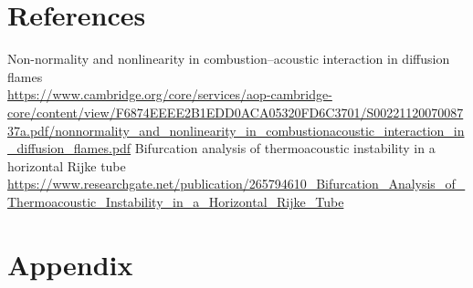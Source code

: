 \documentclass[8pt]{article} %
\begin{document}
\section{References}
\begin{thebibliography}{99}

Non-normality and nonlinearity in combustion–acoustic interaction in diffusion flames\\ \url{https://www.cambridge.org/core/services/aop-cambridge-core/content/view/F6874EEEE2B1EDD0ACA05320FD6C3701/S0022112007008737a.pdf/nonnormality_and_nonlinearity_in_combustionacoustic_interaction_in_diffusion_flames.pdf}
Bifurcation analysis of thermoacoustic
instability in a horizontal Rijke tube\\ \url{https://www.researchgate.net/publication/265794610_Bifurcation_Analysis_of_Thermoacoustic_Instability_in_a_Horizontal_Rijke_Tube}

\end{thebibliography}

\newpage
\section{Appendix}
\end{document}
